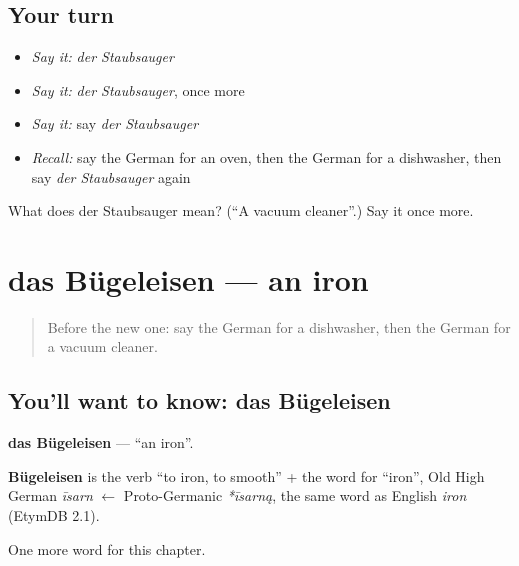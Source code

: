 \subsection*{Your turn}
\begin{itemize}
\raggedright
  \item \emph{Say it:} \emph{der Staubsauger}
  \item \emph{Say it:} \emph{der Staubsauger}, once more
  \item \emph{Say it:} say \emph{der Staubsauger}
  \item \emph{Recall:} say the German for an oven, then the German for a dishwasher, then say \emph{der Staubsauger} again
\end{itemize}

\begin{tcolorbox}[breakable,colback=teal!4,colframe=teal!35!black,title={Before you move on}]
What does der Staubsauger mean? (\textquotedblleft{}A vacuum cleaner\textquotedblright{}.) Say it once more.
\end{tcolorbox}
\section[das Bügeleisen]{das Bügeleisen — an iron}

\label{lesson:GE-C202-buegeleisen}



\begin{quote}
Before the new one: say the German for a dishwasher, then the German for a vacuum cleaner.
\end{quote}

\subsection*{You'll want to know: das Bügeleisen}
\textbf{das Bügeleisen} — \textquotedblleft{}an iron\textquotedblright{}.

\begin{cousinweb}
\textbf{Bügeleisen} is the verb \textquotedblleft{}to iron, to smooth\textquotedblright{} + the word for \textquotedblleft{}iron\textquotedblright{}, Old High German \emph{īsarn} $\leftarrow$ Proto-Germanic \emph{*īsarną}, the same word as English \emph{iron} (EtymDB 2.1).
\end{cousinweb}

\begin{grammarlens}[title={What you've built}]
One more word for this chapter.
\end{grammarlens}

